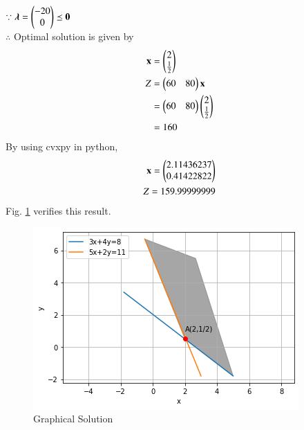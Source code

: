 $\because \boldsymbol{\lambda}=\begin{pmatrix}-20 \\ 0\end{pmatrix} \preceq \mathbf{0} $
\\
$\therefore$ Optimal solution is given by
\begin{align}
    \mathbf{x} &= \begin{pmatrix}2\\ \frac{1}{2}\end{pmatrix} \\
    Z &= \begin{pmatrix}60 & 80\end{pmatrix}\mathbf{x} \\
    &= \begin{pmatrix}60 & 80\end{pmatrix}\begin{pmatrix}2 \\ \frac{1}{2}\end{pmatrix} \\
    &= 160
\end{align}
By using cvxpy in python,
\begin{align}
    \mathbf{x}=\begin{pmatrix}2.11436237\\0.41422822\end{pmatrix}\\
    Z = 159.99999999
\end{align}
Fig. \ref{opt/12/fig:Graphical Solution}	verifies this result.
%
\begin{figure}[!ht]
\centering
\includegraphics[width=\columnwidth]{solutions/su2021/2/12/Graphical Solution_10.png}
\caption{Graphical Solution}
\label{opt/12/fig:Graphical Solution}	
\end{figure}


